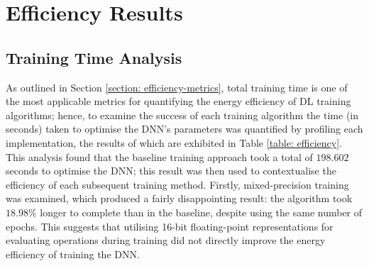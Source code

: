 \documentclass[a4paper, 11pt]{report}
\begin{document}
    \section{Efficiency Results}

    \subsection{Training Time Analysis}

    As outlined in Section \ref{section: efficiency-metrics}, total training time is one of the most applicable metrics for quantifying the energy efficiency of DL training algorithms; hence, to examine the success of each training algorithm the time (in seconds) taken to optimise the DNN's parameters was quantified by profiling each implementation, the results of which are exhibited in Table \ref{table: efficiency}. This analysis found that the baseline training approach took a total of $198.602$ seconds to optimise the DNN; this result was then used to contextualise the efficiency of each subsequent training method. Firstly, mixed-precision training was examined, which produced a fairly disappointing result: the algorithm took $18.98\%$ longer to complete than in the baseline, despite using the same number of epochs. This suggests that utilising 16-bit floating-point representations for evaluating operations during training did not directly improve the energy efficiency of training the DNN.
\end{document}
